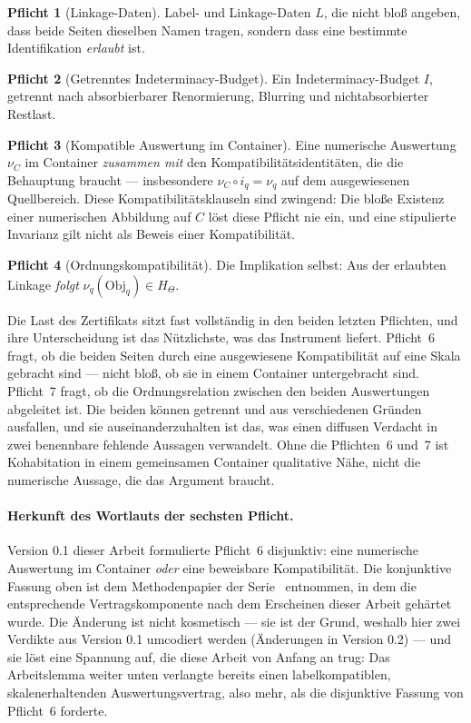\documentclass[11pt,a4paper]{article}
\theoremstyle{definition}
\newtheorem{obligation}{Pflicht}
\begin{document}
\begin{obligation}[Linkage-Daten]
Label- und Linkage-Daten $L$, die nicht bloß angeben, dass beide Seiten dieselben
Namen tragen, sondern dass eine bestimmte Identifikation \emph{erlaubt} ist.
\end{obligation}

\begin{obligation}[Getrenntes Indeterminacy-Budget]
Ein Indeterminacy-Budget $I$, getrennt nach absorbierbarer Renormierung,
Blurring und nichtabsorbierter Restlast.
\end{obligation}

\begin{obligation}[Kompatible Auswertung im Container]
\label{obl:six}
Eine numerische Auswertung $\nu_C$ im Container \emph{zusammen mit} den
Kompatibilitätsidentitäten, die die Behauptung braucht --- insbesondere
$\nu_C \circ i_q = \nu_q$ auf dem ausgewiesenen Quellbereich. Diese
Kompatibilitätsklauseln sind zwingend: Die bloße Existenz einer numerischen
Abbildung auf $C$ löst diese Pflicht nie ein, und eine stipulierte Invarianz gilt
nicht als Beweis einer Kompatibilität.
\end{obligation}

\begin{obligation}[Ordnungskompatibilität]
\label{obl:seven}
Die Implikation selbst: Aus der erlaubten Linkage \emph{folgt}
$\nu_q(\mathrm{Obj}_q) \in H_\Theta$.
\end{obligation}

Die Last des Zertifikats sitzt fast vollständig in den beiden letzten Pflichten,
und ihre Unterscheidung ist das Nützlichste, was das Instrument liefert. Pflicht~6
fragt, ob die beiden Seiten durch eine ausgewiesene Kompatibilität auf eine Skala
gebracht sind --- nicht bloß, ob sie in einem Container untergebracht sind.
Pflicht~7 fragt, ob die Ordnungsrelation zwischen den beiden Auswertungen
abgeleitet ist. Die beiden können getrennt und aus verschiedenen Gründen
ausfallen, und sie auseinanderzuhalten ist das, was einen diffusen Verdacht in
zwei benennbare fehlende Aussagen verwandelt. Ohne die Pflichten~6 und~7 ist
Kohabitation in einem gemeinsamen Container qualitative Nähe, nicht die
numerische Aussage, die das Argument braucht.

\paragraph{Herkunft des Wortlauts der sechsten Pflicht.} Version 0.1 dieser
Arbeit formulierte Pflicht~6 disjunktiv: eine numerische Auswertung im Container
\emph{oder} eine beweisbare Kompatibilität. Die konjunktive Fassung oben ist dem
Methodenpapier der Serie~\cite{GeigerBCM2026} entnommen, in dem die entsprechende
Vertragskomponente nach dem Erscheinen dieser Arbeit gehärtet wurde. Die Änderung
ist nicht kosmetisch --- sie ist der Grund, weshalb hier zwei Verdikte aus
Version 0.1 umcodiert werden (\glqq Änderungen in Version 0.2\grqq) --- und sie löst eine
Spannung auf, die diese Arbeit von Anfang an trug: Das Arbeitslemma weiter unten
verlangte bereits einen \glqq labelkompatiblen, skalenerhaltenden\grqq{} Auswertungsvertrag,
also mehr, als die disjunktive Fassung von Pflicht~6 forderte.
\end{document}
